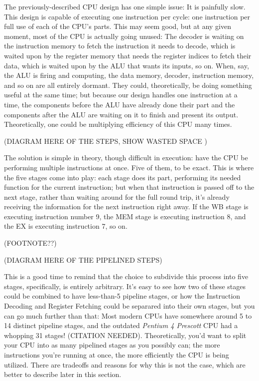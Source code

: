 \documentclass[12pt,twoside]{reedthesis}
\begin{document}
The previously-described CPU design has one simple issue: It is painfully slow. This design is capable of executing one instruction per cycle: one instruction per full use of each of the CPU's parts. This may seem good, but at any given moment, most of the CPU is actually going unused: The decoder is waiting on the instruction memory to fetch the instruction it needs to decode, which is waited upon by the register memory that needs the register indices to fetch their data, which is waited upon by the ALU that wants its inputs, so on.
When, say, the ALU is firing and computing, the data memory, decoder, instruction memory, and so on are all entirely dormant. They could, theoretically, be doing something useful at the same time; but because our design handles one instruction at a time, the components before the ALU have already done their part and the components after the ALU are waiting on it to finish and present its output. Theoretically, one could be multiplying efficiency of this CPU many times.

(DIAGRAM HERE OF THE STEPS, SHOW WASTED SPACE )

The solution is simple in theory, though difficult in execution: have the CPU be performing multiple instructions at once. Five of them, to be exact. This is where the five stages come into play: each stage does its part, performing its needed function for the current instruction; but when that instruction is passed off to the next stage, rather than waiting around for the full round trip, it's already receiving the information for the next instruction right away. If the WB stage is executing instruction number 9, the MEM stage is executing instruction 8, and the EX is executing instruction 7, so on.

(FOOTNOTE??)

(DIAGRAM HERE OF THE PIPELINED STEPS)

This is a good time to remind that the choice to subdivide this process into five stages, specifically, is entirely arbitrary. It's easy to see how two of these stages could be combined to have less-than-5 pipeline stages, or how the Instruction Decoding and Register Fetching could be separared into their own stages, but you can go much further than that: Most modern CPUs have somewhere around 5 to 14 distinct pipeline stages, and the outdated \textit{Pentium 4 Prescott} CPU had a whopping 31 stages! (CITATION NEEDED). Theoretically, you'd want to split your CPU into as many pipelined stages as you possibly can; the more instructions you're running at once, the more efficiently the CPU is being utilized. There are tradeoffs and reasons for why this is not the case, which are better to describe later in this section.
\end{document}
